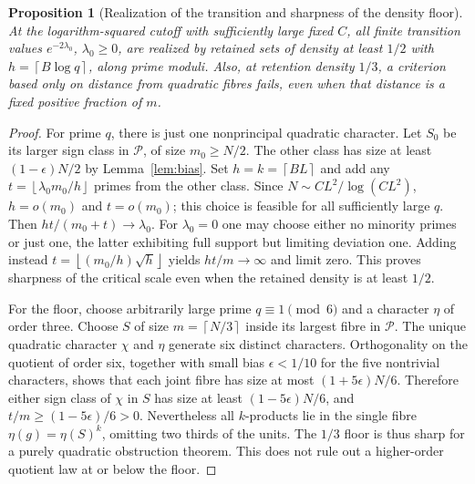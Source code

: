 \documentclass[11pt]{article}
\newtheorem{proposition}[theorem]{Proposition}
\theoremstyle{remark}\newtheorem{remark}[theorem]{Remark}
\newcommand{\Pool}{\mathcal P}
\newcommand{\floor}[1]{\left\lfloor #1\right\rfloor}
\newcommand{\ceil}[1]{\left\lceil #1\right\rceil}
\begin{document}
\begin{proposition}[Realization of the transition and sharpness of the density floor]\label{prop:sharp}
At the logarithm-squared cutoff with sufficiently large fixed $C$, all finite transition values $e^{-2\lambda_0}$, $\lambda_0\ge0$, are realized by retained sets of density at least $1/2$ with $h=\ceil{B\log q}$, along prime moduli. Also, at retention density $1/3$, a criterion based only on distance from quadratic fibres fails, even when that distance is a fixed positive fraction of $m$.
\end{proposition}
\begin{proof}
For prime $q$, there is just one nonprincipal quadratic character. Let $S_0$ be its larger sign class in $\Pool$, of size $m_0\ge N/2$. The other class has size at least $(1-\epsilon)N/2$ by Lemma~\ref{lem:bias}. Set $h=k=\ceil{BL}$ and add any $t=\floor{\lambda_0 m_0/h}$ primes from the other class. Since $N\sim C L^2/\log(C L^2)$, $h=o(m_0)$ and $t=o(m_0)$; this choice is feasible for all sufficiently large $q$. Then $ht/(m_0+t)\to\lambda_0$. For $\lambda_0=0$ one may choose either no minority primes or just one, the latter exhibiting full support but limiting deviation one. Adding instead $t=\floor{(m_0/h)\sqrt h}$ yields $ht/m\to\infty$ and limit zero. This proves sharpness of the critical scale even when the retained density is at least $1/2$.

For the floor, choose arbitrarily large prime $q\equiv1\pmod6$ and a character $\eta$ of order three. Choose $S$ of size $m=\ceil{N/3}$ inside its largest fibre in $\Pool$. The unique quadratic character $\chi$ and $\eta$ generate six distinct characters. Orthogonality on the quotient of order six, together with small bias $\epsilon<1/10$ for the five nontrivial characters, shows that each joint fibre has size at most $(1+5\epsilon)N/6$. Therefore either sign class of $\chi$ in $S$ has size at least $(1-5\epsilon)N/6$, and $t/m\ge(1-5\epsilon)/6>0$. Nevertheless all $k$-products lie in the single fibre $\eta(g)=\eta(S)^k$, omitting two thirds of the units. The $1/3$ floor is thus sharp for a purely quadratic obstruction theorem. This does not rule out a higher-order quotient law at or below the floor.
\end{proof}
\end{document}
